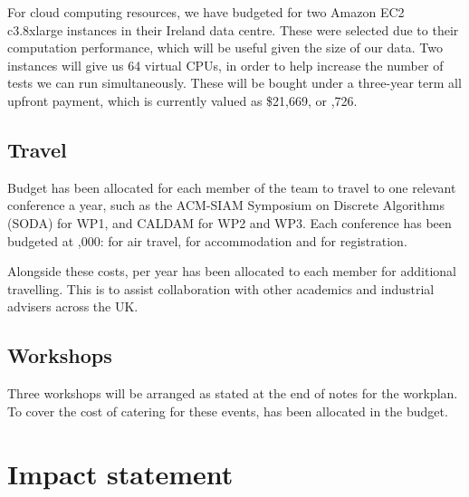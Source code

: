 \documentclass[a4paper,11pt]{article}
\begin{document}
    For cloud computing resources, we have budgeted for two Amazon EC2 c3.8xlarge instances in their Ireland data centre. These were selected due to their computation performance, which will be useful given the size of our data. Two instances will give us 64 virtual CPUs, in order to help increase the number of tests we can run simultaneously. These will be bought under a three-year term all upfront payment, which is currently valued as \$21,669, or ,726.

    \subsection{Travel}

    Budget has been allocated for each member of the team to travel to one relevant conference a year, such as the ACM-SIAM Symposium on Discrete Algorithms (SODA) for WP1, and CALDAM for WP2 and WP3. Each conference has been budgeted at ,000:  for air travel,  for accommodation and  for registration.

    Alongside these costs,  per year has been allocated to each member for additional travelling. This is to assist collaboration with other academics and industrial advisers across the UK.

    \subsection{Workshops}

    Three workshops will be arranged as stated at the end of notes for the workplan. To cover the cost of catering for these events,  has been allocated in the budget.

    \newpage
    \section{Impact statement}
\end{document}
